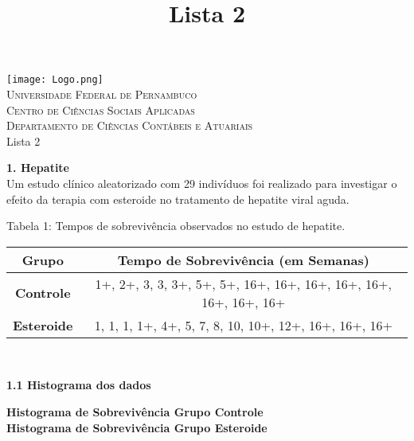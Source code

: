 \documentclass[12pt,a4paper]{article}
\title{Lista 2}
\date{}
\begin{document}
	\begin{center}
		\texttt{[image: Logo.png]}\\
		\textsc{Universidade Federal de Pernambuco\\
			Centro de Ciências Sociais Aplicadas\\
			Departamento de Ciências Contábeis e Atuariais\\}
		\vspace{5cm}
		\huge Lista 2\\ \normalsize
		\vspace{4cm}
	\end{center}
	\newpage
	\textbf{1. Hepatite}
	\vspace{0.5cm}\\
	Um estudo clínico aleatorizado com 29 indivíduos foi realizado para investigar o efeito da terapia com esteroide no tratamento de hepatite viral aguda.
	\begin{center}
		\small{Tabela 1: Tempos de sobrevivência observados no estudo de hepatite.}\\
		\begin{tabular}{|c|c|}\hline
			\textbf{Grupo} & \textbf{Tempo de Sobrevivência (em Semanas)}\\ \hline
			\textbf{Controle} & 1+, 2+, 3, 3, 3+, 5+, 5+, 16+, 16+, 16+, 16+, 16+, 16+, 16+, 16+\\ \hline
			\textbf{Esteroide} & 1, 1, 1, 1+, 4+, 5, 7, 8, 10, 10+, 12+, 16+, 16+, 16+\\ \hline
		\end{tabular}
		\vspace{1cm}\\
	\end{center}
	\textbf{1.1 Histograma dos dados}
	\begin{center}
		\vspace{1cm}
		\textbf{Histograma de Sobrevivência Grupo Controle}
		\vspace{1cm}\\
		\textbf{Histograma de Sobrevivência Grupo Esteroide}
	\end{center}
\end{document}
